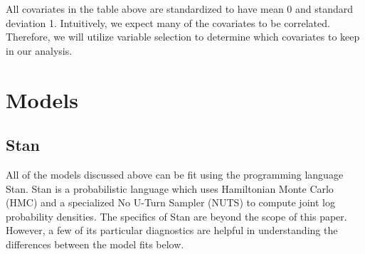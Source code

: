 \documentclass[]{article}
\begin{document}
All covariates in the table above are standardized to have mean 0 and
standard deviation 1. Intuitively, we expect many of the covariates to
be correlated. Therefore, we will utilize variable selection to
determine which covariates to keep in our analysis.

\section{Models}\label{models}

\subsection{Stan}\label{stan}

All of the models discussed above can be fit using the programming
language Stan. Stan is a probabilistic language which uses Hamiltonian
Monte Carlo (HMC) and a specialized No U-Turn Sampler (NUTS) to compute
joint log probability densities. The specifics of Stan are beyond the
scope of this paper. However, a few of its particular diagnostics are
helpful in understanding the differences between the model fits below.
\end{document}
